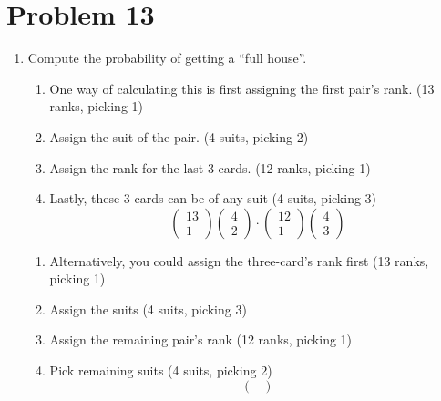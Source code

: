 \documentclass{article}
\begin{document}
\section*{Problem 13}
\begin{enumerate}[label=\alph*)]
    \item Compute the probability of getting a “full house”.
    \begin{enumerate}[label=\arabic*.]
        \item One way of calculating this is first assigning the first pair's rank. (13 ranks, picking 1)
        \item Assign the suit of the pair. (4 suits, picking 2)
        \item Assign the rank for the last 3 cards. (12 ranks, picking 1)
        \item Lastly, these 3 cards can be of any suit (4 suits, picking 3)
        \begin{equation*}
            \begin{pmatrix}
                13 \\
                1
            \end{pmatrix}
            \begin{pmatrix}
                4 \\
                2
            \end{pmatrix}
            \cdot
            \begin{pmatrix}
                12 \\
                1
            \end{pmatrix}
            \begin{pmatrix}
                4 \\
                3
            \end{pmatrix}
        \end{equation*}
    \end{enumerate}
    \begin{enumerate}[label=\arabic*.]
        \item Alternatively, you could assign the three-card's rank first (13 ranks, picking 1)
        \item Assign the suits (4 suits, picking 3)
        \item Assign the remaining pair's rank (12 ranks, picking 1)
        \item Pick remaining suits (4 suits, picking 2)
        \begin{equation*}
            \begin{pmatrix}

\end{pmatrix}
\end{equation*}
\end{enumerate}
\end{enumerate}
\end{document}
